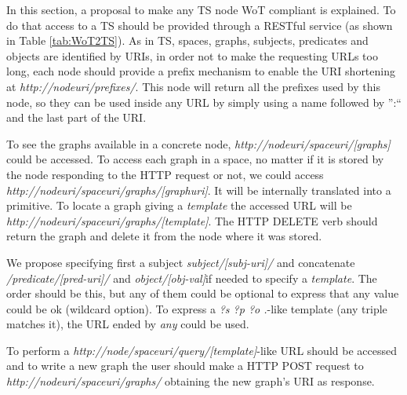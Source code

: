 In this section, a proposal to make any TS node WoT compliant is explained. To do that access to a TS should be provided through a RESTful service
(as shown in Table \ref{tab:WoT2TS}). As in TS, spaces, graphs, subjects, predicates and objects are identified by URIs, in order not to make the
requesting URLs too long, each node should provide a prefix mechanism to enable the URI shortening at \textit{http://nodeuri/prefixes/}.
This node will return all the prefixes used by this node, so they can be used inside any URL by simply using a name followed by '':`` and the last part of the URI.

To see the graphs available in a concrete node, \linebreak \textit{http://nodeuri/spaceuri/[graphs]} could be accessed. To access each graph
in a space, no matter if it is stored by the node responding to the HTTP request or not, we could access \textit{http://nodeuri/spaceuri/graphs/[graphuri]}.
It will be internally translated into a \primread primitive. To locate a graph giving a \textit{template} the accessed URL will be \linebreak
\textit{http://nodeuri/spaceuri/graphs/[template]}. The HTTP \linebreak DELETE verb should return the graph and delete it from the node where it was stored.

We propose specifying first a subject \textit{subject/[subj-uri]/} and concatenate \textit{/predicate/[pred-uri]/} and \textit{object/[obj-val]}\linebreak if needed to specify a \textit{template}. The order should be this, but any of them could be optional to express that any value could be ok (wildcard option). To express a \textit{?s ?p ?o .}-like template (any triple matches it), the URL ended by \textit{any} could be used.

To perform a \primquery \textit{http://node/spaceuri/query/[template]}-like URL should be accessed and to write a new graph the user should make a HTTP POST request to \linebreak \textit{http://nodeuri/spaceuri/graphs/} obtaining the new graph's URI as response.
